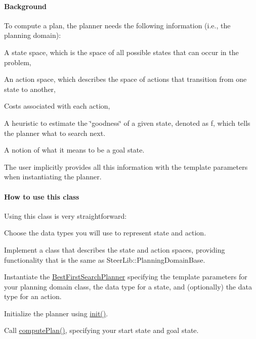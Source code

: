 \paragraph*{Background }

To compute a plan, the planner needs the following information (i.\-e., the planning domain)\-:
\begin{DoxyItemize}
\item A state space, which is the space of all possible states that can occur in the problem,
\item An action space, which describes the space of actions that transition from one state to another,
\item Costs associated with each action,
\item A heuristic to estimate the \char`\"{}goodness\char`\"{} of a given state, denoted as f, which tells the planner what to search next.
\item A notion of what it means to be a goal state.
\end{DoxyItemize}

The user implicitly provides all this information with the template parameters when instantiating the planner.

\paragraph*{How to use this class }

Using this class is very straightforward\-:


\begin{DoxyEnumerate}
\item Choose the data types you will use to represent state and action.
\item Implement a class that describes the state and action spaces, providing functionality that is the same as Steer\-Lib\-::\-Planning\-Domain\-Base.
\item Instantiate the \hyperlink{class_best_first_search_planner}{Best\-First\-Search\-Planner} specifying the template parameters for your planning domain class, the data type for a state, and (optionally) the data type for an action.
\item Initialize the planner using \hyperlink{class_best_first_search_planner_a00c06f79faf00907ec4906086c37776f}{init()}.
\item Call \hyperlink{class_best_first_search_planner_a777fb06939a33b3f3effb24b0dbda076}{compute\-Plan()}, specifying your start state and goal state.
\end{DoxyEnumerate}

